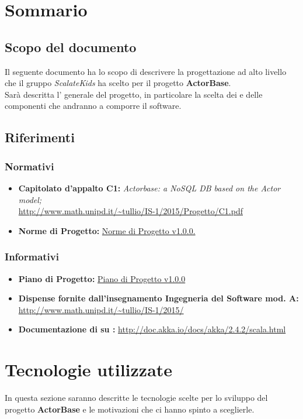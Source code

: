 \documentclass{scalatekids-article}
\begin{document}
\section{Sommario}
\subsection{Scopo del documento}
Il seguente documento ha lo scopo di descrivere la progettazione ad alto livello che il gruppo \textit{ScalateKids} ha scelto per il progetto \textbf{ActorBase}.\\
Sarà descritta l' generale del progetto, in particolare la scelta dei  e delle componenti che andranno a comporre il software.
\prodPurpose
\glossExpl
\subsection{Riferimenti}
\subsubsection{Normativi}
\begin{itemize}
\item\textbf{Capitolato d'appalto C1:} \textit{Actorbase: a NoSQL DB based on the Actor model;}\\
  \url{http://www.math.unipd.it/~tullio/IS-1/2015/Progetto/C1.pdf}
\item\textbf{Norme di Progetto:} \href{run:../Interni/NormeDiProgetto\_v1.0.0.pdf}{Norme di Progetto v1.0.0.}
\end{itemize}
\subsubsection{Informativi}
\begin{itemize}
\item\textbf{Piano di Progetto:} \href{run:./PianoDiProgetto\_v1.0.0.pdf}{Piano di Progetto v1.0.0}
\item\textbf{Dispense fornite dall'insegnamento Ingegneria del Software mod. A:}\\
  \url{http://www.math.unipd.it/~tullio/IS-1/2015/}
\item\textbf{Documentazione di  su :}
  \url{http://doc.akka.io/docs/akka/2.4.2/scala.html}
\end{itemize}
\newpage
\section{Tecnologie utilizzate}
In questa sezione saranno descritte le tecnologie scelte per lo sviluppo del progetto \textbf{ActorBase} e le motivazioni che ci hanno spinto a sceglierle.
\end{document}
